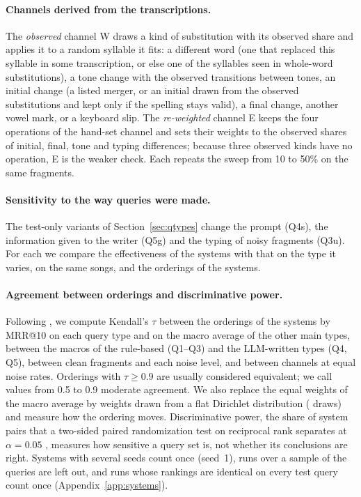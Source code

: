 \documentclass[11pt]{article}
\makeatletter
\newcommand{\Qone}{Q1\xspace}
\newcommand{\Qthree}{Q3\xspace}
\newcommand{\Qfour}{Q4\xspace}
\newcommand{\Qfive}{Q5\xspace}
\newcommand{\mrr}{MRR@10\xspace}
\makeatother
\begin{document}
\paragraph{Channels derived from the transcriptions.} The \emph{observed} channel W draws a kind of
substitution with its observed share and applies it to a random syllable it fits: a different word (one that
replaced this syllable in some transcription, or else one of the syllables seen in whole-word substitutions),
a tone change with the observed transitions between tones, an initial change (a listed merger, or an initial
drawn from the observed substitutions and kept only if the spelling stays valid), a final change, another
vowel mark, or a keyboard slip. The \emph{re-weighted} channel E keeps the four operations of the hand-set
channel and sets their weights to the observed shares of initial, final, tone and typing differences;
because three observed kinds have no operation, E is the weaker check. Each repeats the sweep from 10 to 50\%
on the same fragments.

\paragraph{Sensitivity to the way queries were made.} The test-only variants of Section~\ref{sec:qtypes}
change the prompt (Q4s), the information given to the writer (Q5g) and the typing of noisy fragments (Q3u).
For each we compare the effectiveness of the systems with that on the type it varies, on the same songs, and
the orderings of the systems.

\paragraph{Agreement between orderings and discriminative power.} Following \citet{voorhees2000variations},
we compute Kendall's $\tau$ between the orderings of the systems by \mrr{} on each query type and on the macro
average of the other main types, between the macros of the rule-based (\Qone--\Qthree) and the LLM-written
types (\Qfour, \Qfive), between clean fragments and each noise level, and between channels at equal noise
rates. Orderings with $\tau \geq 0.9$ are usually considered equivalent; we call values from 0.5 to 0.9
moderate agreement. We also replace the equal weights of the macro average by weights drawn from a flat
Dirichlet distribution (\MixDraws{} draws) and measure how the ordering moves. Discriminative power, the share
of system pairs that a two-sided paired randomization test on reciprocal rank separates at $\alpha=0.05$
\citep{sakai2006bootstrap}, measures how sensitive a query set is, not whether its conclusions are right.
Systems with several seeds count once (seed~1), runs over a sample of the queries are left out, and runs
whose rankings are identical on every test query count once (Appendix~\ref{app:systems}).
\end{document}
